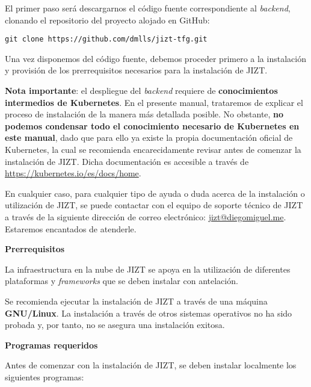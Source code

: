 El primer paso será descargarnos el código fuente correspondiente al \emph{backend}, clonando el repositorio del proyecto alojado en GitHub:

\texttt{git clone https://github.com/dmlls/jizt-tfg.git}

Una vez disponemos del código fuente, debemos proceder primero a la instalación y provisión de los prerrequisitos necesarios para la instalación de JIZT.

\textbf{Nota importante}: el despliegue del \emph{backend} requiere de \textbf{conocimientos intermedios de Kubernetes}. En el presente manual, trataremos de explicar el proceso de instalación de la manera más detallada posible. No obstante, \textbf{no podemos condensar todo el conocimiento necesario de Kubernetes en este manual}, dado que para ello ya existe la propia documentación oficial de Kubernetes, la cual se recomienda encarecidamente revisar antes de comenzar la instalación de JIZT. Dicha documentación es accesible a través de \href{https://kubernetes.io/es/docs/home}{https://kubernetes.io/es/docs/home}.

En cualquier caso, para cualquier tipo de ayuda o duda acerca de la instalación o utilización de JIZT, se puede contactar con el equipo de soporte técnico de JIZT a través de la siguiente dirección de correo electrónico: \href{mailto:jizt@diegomiguel.me}{jizt@diegomiguel.me}. Estaremos encantados de atenderle.

\noindent
\textbf{Prerrequisitos}

La infraestructura en la nube de JIZT se apoya en la utilización de diferentes plataformas y \emph{frameworks} que se deben instalar con antelación.

Se recomienda ejecutar la instalación de JIZT a través de una máquina \textbf{GNU/Linux}. La instalación a través de otros sistemas operativos no ha sido probada y, por tanto, no se asegura una instalación exitosa.

\vspace{0.5cm}
\noindent
\textbf{Programas requeridos}

Antes de comenzar con la instalación de JIZT, se deben instalar localmente los siguientes programas:

